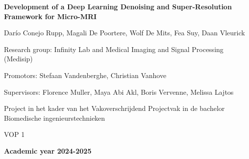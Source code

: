 \documentclass[twocolumn]{article}
\begin{document}
\begin{titlepage}
    \centering
    \vspace*{\fill}
    
    {\LARGE \textbf{Development of a Deep Learning Denoising and Super-Resolution Framework for Micro-MRI} \par}
    \vspace{0.5cm}

    {\Large Darío Conejo Rupp, Magali De Poortere, Wolf De Mits, Fea Suy, Daan Vleurick \par}
    \vspace{2cm}

    {\large Research group: Infinity Lab and Medical Imaging and Signal Processing (Medisip) \par}
    \vspace{0.2cm}

    {\large Promotors: Stefaan Vandenberghe, Christian Vanhove \par}
    \vspace{0.2cm}

    {\large Supervisors: Florence Muller, Maya Abi Akl, Boris Vervenne, Melissa Lajtos \par}

    \vspace{2cm}

    {\large {Project in het kader van het Vakoverschrijdend Projectvak in de bachelor Biomedische ingenieurstechnieken} \par}
    {\large {VOP 1} \par}
    {\large \textbf{Academic year 2024-2025} \par}

    \vspace*{\fill}
\end{titlepage}
\end{document}
